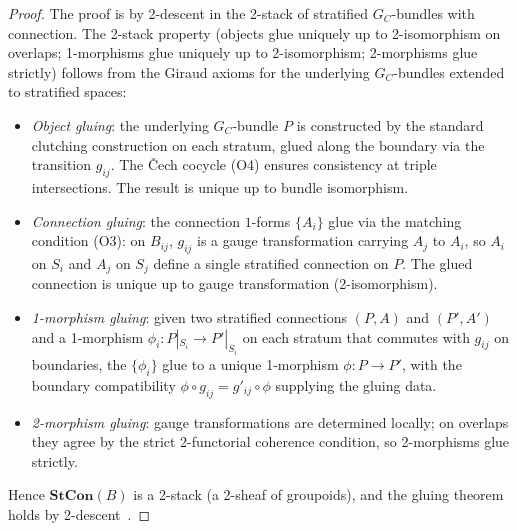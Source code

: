 \documentclass[11pt,a4paper]{article}
\theoremstyle{plain}
\theoremstyle{definition}
\theoremstyle{remark}
\begin{document}
\begin{proof}
The proof is by 2-descent in the 2-stack of stratified $G_C$-bundles with
connection. The 2-stack property (objects glue uniquely up to
2-isomorphism on overlaps; 1-morphisms glue uniquely up to 2-isomorphism;
2-morphisms glue strictly) follows from the Giraud axioms for the
underlying $G_C$-bundles extended to stratified spaces:
\begin{itemize}[leftmargin=*,itemsep=2pt]
\item \emph{Object gluing}: the underlying $G_C$-bundle $P$ is constructed
  by the standard clutching construction on each stratum, glued along the
  boundary via the transition $g_{ij}$. The Čech cocycle (O4) ensures
  consistency at triple intersections. The result is unique up to
  bundle isomorphism.
\item \emph{Connection gluing}: the connection $1$-forms $\{A_i\}$ glue
  via the matching condition (O3): on $B_{ij}$, $g_{ij}$ is a gauge
  transformation carrying $A_j$ to $A_i$, so $A_i$ on $S_i$ and $A_j$
  on $S_j$ define a single stratified connection on $P$. The glued
  connection is unique up to gauge transformation (2-isomorphism).
\item \emph{1-morphism gluing}: given two stratified connections $(P, A)$
  and $(P', A')$ and a 1-morphism $\phi_i : P|_{S_i} \to P'|_{S_i}$ on
  each stratum that commutes with $g_{ij}$ on boundaries, the
  $\{\phi_i\}$ glue to a unique 1-morphism $\phi : P \to P'$, with the
  boundary compatibility $\phi \circ g_{ij} = g'_{ij} \circ \phi$
  supplying the gluing data.
\item \emph{2-morphism gluing}: gauge transformations are determined
  locally; on overlaps they agree by the strict 2-functorial coherence
  condition, so 2-morphisms glue strictly.
\end{itemize}
Hence $\mathbf{StCon}(B)$ is a 2-stack (a 2-sheaf of groupoids), and the
gluing theorem holds by 2-descent~\cite{giraud1971cohomologie,breen1994classification,breen2001gerbes,bartels2007higher}.
\end{proof}
\end{document}
